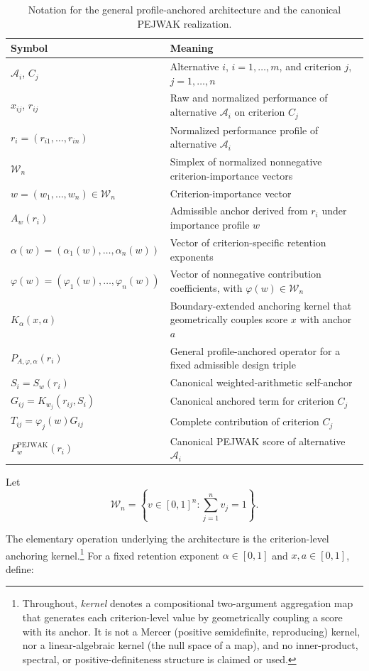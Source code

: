 \documentclass[reqno,11pt]{amsart}
\theoremstyle{definition}
\theoremstyle{plain}
\theoremstyle{remark}
\begin{document}
\begin{table}[htbp]
\caption{Notation for the general profile-anchored architecture and the canonical PEJWAK realization.}
\label{tab:pejwak-notation}
\centering
\small
\renewcommand{\arraystretch}{1.14}
\begin{tabularx}{\textwidth}{@{}p{3.3cm}X@{}}
\toprule
Symbol & Meaning \\
\midrule
$\mathcal A_i$, $C_j$
&
Alternative $i$, $i=1,\ldots,m$, and criterion $j$, $j=1,\ldots,n$
\\
$x_{ij}$, $r_{ij}$
&
Raw and normalized performance of alternative $\mathcal A_i$ on criterion $C_j$
\\
$r_i=(r_{i1},\ldots,r_{in})$
&
Normalized performance profile of alternative $\mathcal A_i$
\\
$\mathcal W_n$
&
Simplex of normalized nonnegative criterion-importance vectors
\\
$w=(w_1,\ldots,w_n)\in\mathcal W_n$
&
Criterion-importance vector
\\
$A_w(r_i)$
&
Admissible anchor derived from $r_i$ under importance profile $w$
\\
$\alpha(w)=(\alpha_1(w),\ldots,\alpha_n(w))$
&
Vector of criterion-specific retention exponents
\\
$\varphi(w)=(\varphi_1(w),\ldots,\varphi_n(w))$
&
Vector of nonnegative contribution coefficients, with $\varphi(w)\in\mathcal W_n$
\\
$K_{\alpha}(x,a)$
&
Boundary-extended anchoring kernel that geometrically couples score $x$ with anchor $a$
\\
$P_{A,\varphi,\alpha}(r_i)$
&
General profile-anchored operator for a fixed admissible design triple
\\
$S_i=S_w(r_i)$
&
Canonical weighted-arithmetic self-anchor
\\
$G_{ij}=K_{w_j}(r_{ij},S_i)$
&
Canonical anchored term for criterion $C_j$
\\
$T_{ij}=\varphi_j(w)G_{ij}$
&
Complete contribution of criterion $C_j$
\\
$P_w^{\mathrm{PEJWAK}}(r_i)$
&
Canonical PEJWAK score of alternative $\mathcal A_i$
\\
\bottomrule
\end{tabularx}
\end{table}
Let
\begin{equation*}
\mathcal W_n
=
\left\{
v\in[0,1]^n:
\sum_{j=1}^{n}v_j=1
\right\}.
\end{equation*}

The elementary operation underlying the architecture is the criterion-level anchoring kernel.\footnote{Throughout, \emph{kernel} denotes a compositional two-argument aggregation map that generates each criterion-level value by geometrically coupling a score with its anchor. It is not a Mercer (positive semidefinite, reproducing) kernel, nor a linear-algebraic kernel (the null space of a map), and no inner-product, spectral, or positive-definiteness structure is claimed or used.} For a fixed retention exponent $\alpha\in[0,1]$ and $x,a\in[0,1]$, define:
\end{document}
